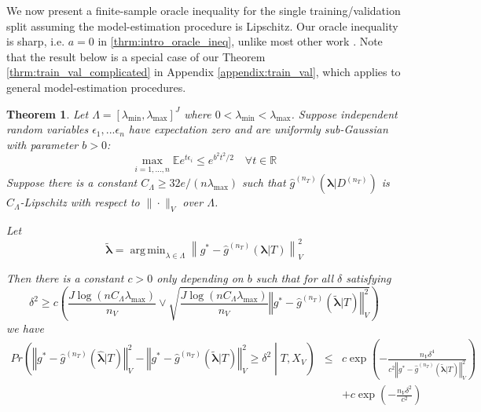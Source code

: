 \documentclass[12pt]{article}
\newtheorem{theorem}{Theorem}
\DeclareMathOperator*{\argmin}{arg\,min}
\begin{document}
We now present a finite-sample oracle inequality for the single training/validation split assuming the model-estimation procedure is Lipschitz. Our oracle inequality is sharp, i.e. $a=0$ in \eqref{thrm:intro_oracle_ineq}, unlike most other work \citep{gyorfi2006distribution, lecue2012oracle, van2003unified}. Note that the result below is a special case of our Theorem \ref{thrm:train_val_complicated} in Appendix \ref{appendix:train_val}, which applies to general model-estimation procedures.
\begin{theorem}
\label{thrm:train_val}
Let $\Lambda=[\lambda_{\min},\lambda_{\max}]^{J}$ where $0 < \lambda_{\min} < \lambda_{\max}$. Suppose independent random variables $\epsilon_1, ... \epsilon_n$ have expectation zero and are uniformly sub-Gaussian with parameter $b > 0$:
$$
\max_{i=1,...,n} \mathbb{E} e^{t \epsilon_i} \le e^{b^2t^2/2} \quad \forall t \in \mathbb{R}
$$
Suppose there is a constant $C_\Lambda \ge 32e/(n \lambda_{\max})$ such that $\hat g^{(n_T)}(\boldsymbol{\lambda} |D^{(n_T)})$ is $C_\Lambda$-Lipschitz with respect to $\| \cdot \|_V$ over $\Lambda$.

Let 
\begin{equation}
\tilde{\boldsymbol \lambda} = \argmin_{\lambda \in \Lambda} \left \| g^*-\hat{g}^{(n_T)}( \boldsymbol{\lambda} | T) \right \|_{V}^{2}
\label{eq:tilde_lambda_def}
\end{equation}

Then there is a constant $c>0$ only depending on $b$ such that for all $\delta$ satisfying
\begin{equation}
\delta^{2}
\ge
c \left ( 
\frac{J\log (n C_\Lambda\lambda_{\max})}{n_{V}}
\vee 
\sqrt{\frac{J \log (n C_\Lambda \lambda_{\max})}{n_{V}}\left\Vert g^* - \hat{g}^{(n_T)}( \tilde{\boldsymbol{\lambda}} | T)\right\Vert_{V}^2}
\right )
\label{thrm:train_val_delta}
\end{equation}
we have
\begin{eqnarray*}
	Pr\left(
	\left\Vert g^* - \hat{g}^{(n_T)}( \hat{\boldsymbol{\lambda}} | T) \right\Vert _{V}^2 -
	\left\Vert g^* - \hat{g}^{(n_T)}( \tilde{\boldsymbol{\lambda}} | T) \right\Vert _{V}^2
	\ge\delta^2
	\middle | 
	T, X_V
	\right )
	&\le& c\exp\left(-\frac{n_{V}\delta^{4}}{
		c^{2}
		\left\Vert g^* - \hat{g}^{(n_T)}( \tilde{\boldsymbol{\lambda}} | T) \right\Vert _{V}^2
	}\right) \\
	&& +c\exp\left(-\frac{n_{V}\delta^{2}}{c^{2}}\right) \\
\end{eqnarray*}

\end{theorem}
\end{document}
